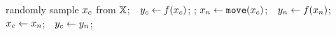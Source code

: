 \Procedure{\opofea}{$\objFun:\solutionSpace\mapsto\naturalNumbers$}%
%
\State {}%
\State randomly sample $\mbox{\ensuremath{x_{c}}}$ from $\mathbb{X}$;~~$\mbox{\ensuremath{y_{c}}} \gets \mbox{\ensuremath{f\!\left(\mbox{\ensuremath{x_{c}}}\right)}}$;%
\State {};%
%
%
\State $\mbox{\ensuremath{x_{n}}} \gets \texttt{move}(\mbox{\ensuremath{x_{c}}})$;~~$\mbox{\ensuremath{y_{n}}} \gets \mbox{\ensuremath{f\!\left(\mbox{\ensuremath{x_{n}}}\right)}}$;%
%
\State {}%
%
%
\State $\mbox{\ensuremath{x_{c}}} \gets \mbox{\ensuremath{x_{n}}}$;~~$\mbox{\ensuremath{y_{c}}} \gets \mbox{\ensuremath{y_{n}}}$;%
\EndIf%
\smallskip%
\EndIf%
\EndWhile%
\Return \bestcolor{\bestSoFarX, \bestSoFarF}%
\EndProcedure%